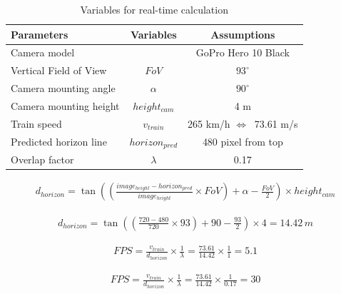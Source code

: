 \begin{table}[H]
    \centering
    \begin{tabular}{|l|c|c|}
        \hline
        \textbf{Parameters} & \textbf{Variables} & \textbf{Assumptions}\\
        \hline
        Camera model & & GoPro Hero 10 Black \cite{goproHero10} \\
        \hline
        Vertical Field of View & $FoV$ & $93^\circ$ \cite{goproHero10} \\
        \hline
        Camera mounting angle & $\alpha$ & $90^\circ$ \\
        \hline
        Camera mounting height & $height_{cam}$ & 4 m \\
        \hline
        Train speed & $v_{train}$ & 265 km/h \cite{geschwindigkeitZugAustria} $ \Leftrightarrow\ $ 73.61 m/s\\
        \hline
        Predicted horizon line & $ horizon_{pred} $ & 480 pixel from top \\
        \hline
        Overlap factor & $\lambda$ & 0.17 \\
        \hline
    \end{tabular}
    \caption{Variables for real-time calculation}
    \label{tab:variablesForRealTime}
\end{table}

\begin{align}
    d_{horizon} = \tan \left( \left( \frac{image_{height} - horizon_{pred}}{image_{height}} \times FoV \right) + \alpha - \frac{FoV}{2} \right) \times height_{cam}
    \label{func:dHorizon}
\end{align}

\begin{align}
    d_{horizon} = \tan \left( \left( \frac{720 - 480}{720} \times 93 \right) + 90 - \frac{93}{2} \right) \times 4 = 14.42 \, {m}
    \label{func:dHorizonValues}
\end{align}

\begin{align}
    FPS = \frac{v_{train}}{d_{horizon}} \times \frac{1}{\lambda} = \frac{73.61}{14.42} \times \frac{1}{1} = 5.1
    \label{func:FPSValues}
\end{align}

\begin{align}
    FPS = \frac{v_{train}}{d_{horizon}} \times \frac{1}{\lambda} = \frac{73.61}{14.42} \times \frac{1}{0.17} = 30
    \label{func:FPSValuesOverlap}
\end{align}

